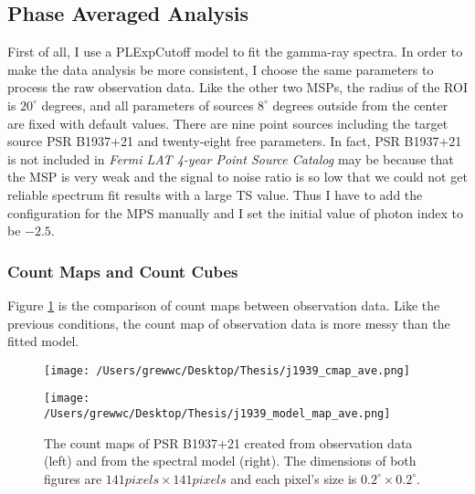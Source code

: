 \documentclass[12pt]{report}
\newcommand{\fgl}[0]{
  \textit{Fermi LAT 4-year Point Source Catalog}
}
\begin{document}
          \subsection{Phase Averaged Analysis}
            First of all, I use a PLExpCutoff model to fit the gamma-ray spectra. 
            In order to make the data analysis be more consistent, I choose the same parameters
            to process the raw observation data. Like the other two MSPs, the radius of the ROI 
            is $20^{\circ}$ degrees, and all parameters of sources $8^{\circ}$ degrees outside 
            from the center are fixed with default values. There are nine point sources including 
            the target source PSR B1937+21 and twenty-eight free parameters. In fact, PSR B1937+21
            is not included in \fgl{} may be because that the MSP is very weak 
            and the signal to noise ratio is so low that we could not get reliable spectrum fit 
            results with a large TS value.  Thus I have to add the configuration for the MPS 
            manually and I set the initial value of photon index to be $-2.5$.

            \subsubsection{Count Maps and Count Cubes}
              Figure \ref{fig: j1939_count_map_ave} is the comparison of count maps between 
              observation data. Like the previous conditions, the count map of observation data is 
              more messy than the fitted model. 

              \begin{figure}[!ht]
                \begin{center}
                \begin{minipage}{0.45\textwidth}
                  \begin{center} 
                    \texttt{[image: /Users/grewwc/Desktop/Thesis/j1939\_cmap\_ave.png]}
                  \end{center}
                \end{minipage}
                \begin{minipage}{0.45\textwidth}
                  \begin{center}
                    \texttt{[image: /Users/grewwc/Desktop/Thesis/j1939\_model\_map\_ave.png]}
                  \end{center}
                \end{minipage}
              \end{center}
              \caption{The count maps of PSR B1937+21 created from observation 
                  data (\textsf{left}) and from the spectral model (\textsf{right}). The dimensions
                  of both figures are $141 pixels \times 141 pixels$ and each pixel's size is
                  $0.2^{\circ}\times0.2^{\circ}$.}
                \label{fig: j1939_count_map_ave}
              \end{figure}
\end{document}
